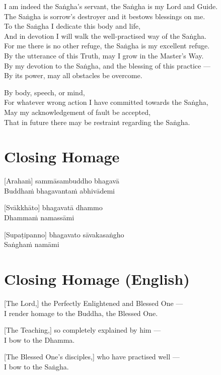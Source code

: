 I am indeed the Saṅgha's servant, the Saṅgha is my Lord and Guide.\\
The Saṅgha is sorrow's destroyer and it bestows blessings on me.\\
To the Saṅgha I dedicate this body and life,\\
And in devotion I will walk the well-practised way of the Saṅgha.\\
For me there is no other refuge, the Saṅgha is my excellent refuge.\\
By the utterance of this Truth, may I grow in the Master's Way.\\
By my devotion to the Saṅgha, and the blessing of this practice ---\\
By its power, may all obstacles be overcome.


By body, speech, or mind,\\
For whatever wrong action I have committed towards the Saṅgha,\\
May my acknowledgement of fault be accepted,\\
That in future there may be restraint regarding the Saṅgha.

\section*{Closing Homage}

[Arahaṁ] sammāsambuddho bhagavā\\
Buddhaṁ bhagavantaṁ abhivādemi

[Svākkhāto] bhagavatā dhammo\\
Dhammaṁ namassāmi

[Supaṭipanno] bhagavato sāvakasaṅgho\\
Saṅghaṁ namāmi

\section*{Closing Homage (English)}

[The Lord,] the Perfectly Enlightened and Blessed One ---\\
I render homage to the Buddha, the Blessed One.

[The Teaching,] so completely explained by him ---\\
I bow to the Dhamma.

[The Blessed One's disciples,] who have practised well ---\\
I bow to the Saṅgha.

